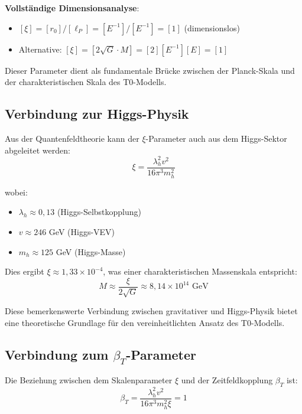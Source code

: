 \documentclass[12pt,a4paper]{article}
\begin{document}
\textbf{Vollständige Dimensionsanalyse}:
\begin{itemize}
	\item $[\xi] = [r_0]/[\ell_P] = [E^{-1}]/[E^{-1}] = [1]$ (dimensionslos) \checkmark
	\item Alternative: $[\xi] = [2\sqrt{G} \cdot M] = [2][E^{-1}][E] = [1]$ \checkmark
\end{itemize}

Dieser Parameter dient als fundamentale Brücke zwischen der Planck-Skala und der charakteristischen Skala des T0-Modells.

\subsection{Verbindung zur Higgs-Physik}
\label{subsec:higgs_connection}

Aus der Quantenfeldtheorie kann der $\xi$-Parameter auch aus dem Higgs-Sektor abgeleitet werden:
\begin{equation}
	\xi = \frac{\lambda_h^2 v^2}{16\pi^3 m_h^2}
\end{equation}

wobei:
\begin{itemize}
	\item $\lambda_h \approx 0,13$ (Higgs-Selbstkopplung)
	\item $v \approx 246$ GeV (Higgs-VEV)
	\item $m_h \approx 125$ GeV (Higgs-Masse)
\end{itemize}

Dies ergibt $\xi \approx 1,33 \times 10^{-4}$, was einer charakteristischen Massenskala entspricht:
\begin{equation}
	M \approx \frac{\xi}{2\sqrt{G}} \approx 8,14 \times 10^{14} \text{ GeV}
\end{equation}

Diese bemerkenswerte Verbindung zwischen gravitativer und Higgs-Physik bietet eine theoretische Grundlage für den vereinheitlichten Ansatz des T0-Modells.

\subsection{Verbindung zum $\beta_T$-Parameter}
\label{subsec:beta_t_connection}

Die Beziehung zwischen dem Skalenparameter $\xi$ und der Zeitfeldkopplung $\beta_T$ ist:
\begin{equation}
	\beta_T = \frac{\lambda_h^2 v^2}{16\pi^3 m_h^2 \xi} = 1
\end{equation}
\end{document}
